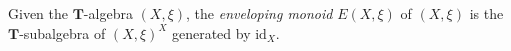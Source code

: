 Given the $\mathbf{T}$-algebra $(X, \xi)$, the \textit{enveloping monoid} $E(X, \xi)$ of $(X, \xi)$ is the $\mathbf{T}$-subalgebra of $(X, \xi)^X$ generated by $\mathrm{id}_X$.
